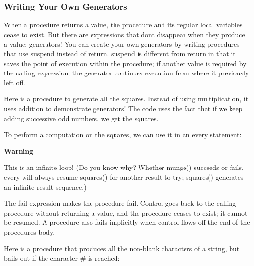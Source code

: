 \subsubsection[Writing Your Own Generators]{Writing Your Own Generators}

When a procedure returns a value, the procedure and its
regular local variables cease to exist. But there are expressions that
don{\textquotesingle}t disappear when they produce a value: generators!
You can create your own generators by writing procedures that use
\textsf{suspend} instead of \textsf{return. suspend} is different from
\textsf{return} in that it saves the point of execution within the
procedure; if another value is required by the calling expression, the
generator continues execution from where it previously left off.

Here is a procedure to generate all the squares. Instead of using
multiplication, it uses addition to demonstrate generators! The code
uses the fact that if we keep adding successive odd numbers, we get the
squares.


To perform a computation on the squares, we can use it in an
\textsf{every} statement:


{\sffamily\bfseries
Warning}

{\sffamily
This is an infinite loop! (Do you know why? Whether munge() succeeds or
fails, \textrm{every} will always resume squares() for another result
to try; squares() generates an infinite result sequence.)}

The \textsf{fail} expression makes the
procedure fail. Control goes back to the calling procedure without
returning a value, and the procedure ceases to exist; it cannot be
resumed. A procedure also fails implicitly when control flows off the
end of the procedure{\textquotesingle}s body.

Here is a procedure that produces all the non-blank characters of a
string, but bails out if the character \textsf{\#} is reached:

